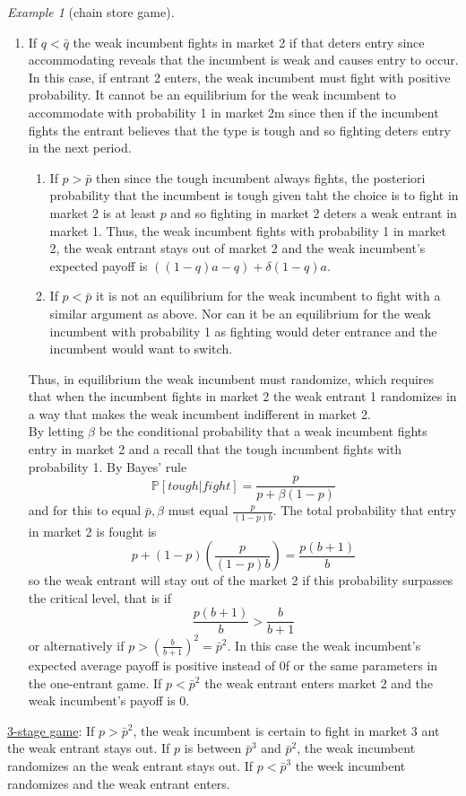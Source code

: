 \documentclass[a4paper, 12pt]{article}
\theoremstyle{plain}
\theoremstyle{definition}
\theoremstyle{lemma}
\theoremstyle{remark}
\theoremstyle{corollary}
\theoremstyle{example}
\newtheorem{example}[theorem]{Example}
\begin{document}
\begin{example}[chain store game]
\begin{enumerate}
			\item If $q<\bar q$ the weak incumbent fights in market 2 if that deters entry since accommodating reveals that the incumbent is weak and causes entry to occur. In this case, if entrant 2 enters, the weak incumbent must fight with positive probability. It cannot be an equilibrium for the weak incumbent to accommodate with probability 1 in market 2m since then if the incumbent fights the entrant believes that the type is tough and so fighting deters entry in the next period.
			\begin{enumerate}
				\item If $p>\bar p$ then since the tough incumbent always fights, the posteriori probability that the incumbent is tough given taht the choice is to fight in market 2 is at least $p$ and so fighting in market 2 deters a weak entrant in market 1. Thus, the weak incumbent fights with probability 1 in market 2, the weak entrant stays out of market 2 and the weak incumbent's expected payoff is $((1-q)a-q) + \delta(1-q)a$. 
				\item If $p<\bar p$ it is not an equilibrium for the weak incumbent to fight with a similar argument as above. Nor can it be an equilibrium for the weak incumbent with probability 1 as fighting would deter entrance and the incumbent would want to switch.
			\end{enumerate}
			Thus, in equilibrium the weak incumbent must randomize, which requires that when the incumbent fights in market 2 the weak entrant 1 randomizes in a way that makes the weak incumbent indifferent in market 2.\\
			By letting $\beta$ be the conditional probability that a weak incumbent fights entry in market 2 and a recall that the tough incumbent fights with probability 1. By Bayes' rule \[\mathbb{P}[tough|fight] = \frac{p}{p+\beta(1-p)}\] and for this to equal $\bar p, \beta$ must equal $\frac{p}{(1-p)b}$. The total probability that entry in market 2 is fought is \[p+(1-p)(\frac{p}{(1-p)b}) = \frac{p(b+1)}{b}\] so the weak entrant will stay out of the market 2 if this probability surpasses the critical level, that is if \[\frac{p(b+1)}{b} > \frac{b}{b+1}\] or alternatively if $p>\left(\frac{b}{b+1}\right)^2 = \bar p^2$. In this case the weak incumbent's expected average payoff is positive instead of 0f or the same parameters in the one-entrant game. If $p<\bar p^2$ the weak entrant enters market 2 and the weak incumbent's payoff is 0.
		\end{enumerate}
		\underline{3-stage game}: If $p>\bar p^2$, the weak incumbent is certain to fight in market 3 ant the weak entrant stays out. If $p$ is between $\bar p^3$ and $\bar p^2$, the weak incumbent randomizes an the weak entrant stays out. If $p<\bar p^3$ the week incumbent randomizes and the weak entrant enters. 

\end{example}
\end{document}
